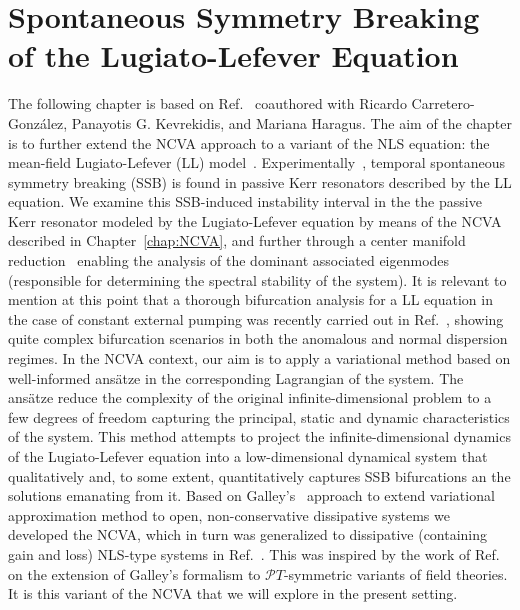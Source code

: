 \chapter{Spontaneous Symmetry Breaking of the Lugiato-Lefever Equation}
\label{chap:LL}

The following chapter is based on Ref.~\cite{JuliaSSB} coauthored with Ricardo Carretero-Gonz\'alez, Panayotis G. Kevrekidis, and Mariana Haragus.  The aim of the chapter is to further extend the NCVA approach to a variant of the NLS equation: the mean-field Lugiato-Lefever (LL) 
model~\cite{LL,LLE}.  Experimentally~\cite{XuCoen}, temporal spontaneous symmetry breaking (SSB) is found in passive Kerr resonators described by the LL equation.  We examine this SSB-induced 
instability interval in the the passive 
Kerr resonator modeled by the Lugiato-Lefever equation %
by means of the NCVA~\cite{JuliaNCVA} described in Chapter~\ref{chap:NCVA}, and further through
a center manifold reduction~\cite{MH-Iooss}
enabling the analysis of the dominant associated eigenmodes (responsible
for determining the spectral stability of the system).  
It is relevant to mention at this point that a thorough  bifurcation analysis for a LL equation in the case of constant external pumping
was recently carried out in Ref.~\cite{LLE_french_PRA}, showing quite complex bifurcation scenarios in both the anomalous and normal dispersion regimes.
%
In the NCVA context, our aim is to
apply a variational method based on well-informed ans\"{a}tze 
in the corresponding
Lagrangian of the system.  The ans\"{a}tze reduce the complexity of the 
original 
infinite-dimensional problem to a few degrees of freedom capturing the 
principal,
static and dynamic characteristics of the system.  
%
This method attempts to project the infinite-dimensional dynamics of the Lugiato-Lefever equation 
into a low-dimensional dynamical system that qualitatively and, to some
extent, quantitatively captures SSB bifurcations an the solutions emanating from it.
%
Based on Galley's~\cite{Galley} approach to extend variational approximation method to open, non-conservative dissipative systems we developed the NCVA,  
which in turn was generalized to dissipative (containing gain and loss) NLS-type
systems in Ref.~\cite{JuliaNCVA}.  This was inspired by the work of Ref.~\cite{ref4} on the 
extension of Galley's formalism to ${\mathcal PT}$-symmetric variants of field theories. It is this variant of the NCVA that we will explore in the present
setting.

